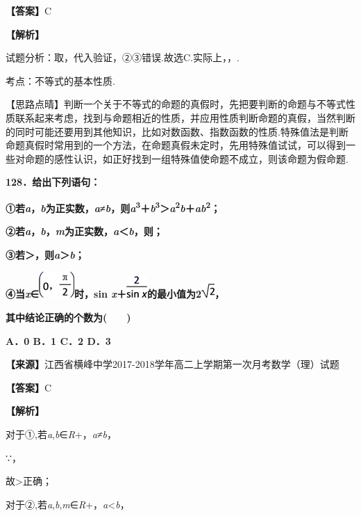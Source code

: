 \documentclass[
]{article}
\begin{document}
\textbf{【答案】}C

\textbf{【解析】}

试题分析：取，代入验证，②③错误.故选C.实际上，，.

考点：不等式的基本性质.

【思路点晴】判断一个关于不等式的命题的真假时，先把要判断的命题与不等式性质联系起来考虑，找到与命题相近的性质，并应用性质判断命题的真假，当然判断的同时可能还要用到其他知识，比如对数函数、指数函数的性质.特殊值法是判断命题真假时常用到的一个方法，在命题真假未定时，先用特殊值试试，可以得到一些对命题的感性认识，如正好找到一组特殊值使命题不成立，则该命题为假命题.

\textbf{128．给出下列语句：}

\textbf{①若\emph{a}，\emph{b}为正实数，\emph{a}≠\emph{b}，则\emph{a}\textsuperscript{3}＋\emph{b}\textsuperscript{3}＞\emph{a}\textsuperscript{2}\emph{b}＋\emph{ab}\textsuperscript{2}；}

\textbf{②若\emph{a}，\emph{b}，\emph{m}为正实数，\emph{a}＜\emph{b}，则；}

\textbf{③若＞，则\emph{a}＞\emph{b}；}

\textbf{④当\emph{x}∈}\includegraphics[width=0.53125in,height=0.39583in]{Fig//media/image1358.png}\textbf{时，sin
\emph{x}＋}\includegraphics[width=0.3125in,height=0.32292in]{Fig//media/image1359.png}\textbf{的最小值为2}\includegraphics[width=0.19792in,height=0.20833in]{Fig//media/image1360.png}\textbf{，}

\textbf{其中结论正确的个数为(　　)}

\textbf{A．0 B．1 C．2 D．3}

\textbf{【来源】}江西省横峰中学2017-2018学年高二上学期第一次月考数学（理）试题

\textbf{【答案】}C

\textbf{【解析】}

对于①,若\emph{a},\emph{b}∈\emph{R}+，\emph{a}≠\emph{b}，

∵，

故\textgreater 正确；

对于②,若\emph{a},\emph{b},\emph{m}∈\emph{R}+，\emph{a}\textless{}\emph{b}，
\end{document}
